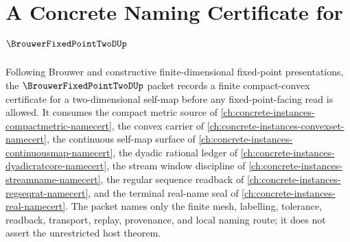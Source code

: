 \chapter{A Concrete Naming Certificate for $\BrouwerFixedPointTwoDUp$}
\label{ch:concrete-instances-brouwer-fixed-point-2d-namecert}

Following Brouwer and constructive finite-dimensional fixed-point presentations, the $\BrouwerFixedPointTwoDUp$ packet records a finite compact-convex certificate for a two-dimensional self-map before any fixed-point-facing read is allowed. It consumes the compact metric source of \autoref{ch:concrete-instances-compactmetric-namecert}, the convex carrier of \autoref{ch:concrete-instances-convexset-namecert}, the continuous self-map surface of \autoref{ch:concrete-instances-continuousmap-namecert}, the dyadic rational ledger of \autoref{ch:concrete-instances-dyadicratcore-namecert}, the stream window discipline of \autoref{ch:concrete-instances-streamname-namecert}, the regular sequence readback of \autoref{ch:concrete-instances-regseqrat-namecert}, and the terminal real-name seal of \autoref{ch:concrete-instances-real-namecert}. The packet names only the finite mesh, labelling, tolerance, readback, transport, replay, provenance, and local naming route; it does not assert the unrestricted host theorem.

